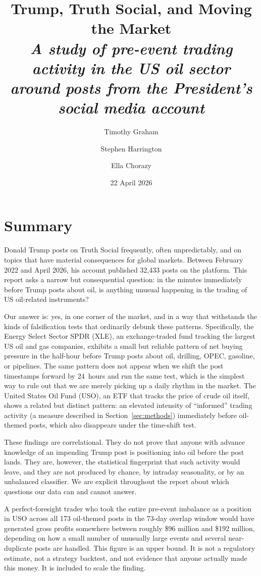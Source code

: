 \documentclass[11pt,a4paper]{article}
\title{\bfseries\Huge Trump, Truth Social, and Moving the Market\\[6pt]
       \large\mdseries\itshape A study of pre-event trading activity in the US oil sector\\
       around posts from the President's social media account}
\author{\large Timothy Graham \and Stephen Harrington \and Ella Chorazy}
\date{22 April 2026}
\begin{document}
\maketitle
\thispagestyle{empty}

\section*{Summary}

Donald Trump posts on Truth Social frequently, often unpredictably, and on topics that have material consequences for global markets. Between February 2022 and April 2026, his account published 32{,}433 posts on the platform. This report asks a narrow but consequential question: in the minutes immediately before Trump posts about oil, is anything unusual happening in the trading of US oil-related instruments?

Our answer is: yes, in one corner of the market, and in a way that withstands the kinds of falsification tests that ordinarily debunk these patterns. Specifically, the Energy Select Sector SPDR (XLE), an exchange-traded fund tracking the largest US oil and gas companies, exhibits a small but reliable pattern of net buying pressure in the half-hour before Trump posts about oil, drilling, OPEC, gasoline, or pipelines. The same pattern does not appear when we shift the post timestamps forward by 24~hours and run the same test, which is the simplest way to rule out that we are merely picking up a daily rhythm in the market. The United States Oil Fund (USO), an ETF that tracks the price of crude oil itself, shows a related but distinct pattern: an elevated intensity of ``informed'' trading activity (a measure described in Section~\ref{sec:methods}) immediately before oil-themed posts, which also disappears under the time-shift test.

These findings are correlational. They do not prove that anyone with advance knowledge of an impending Trump post is positioning into oil before the post lands. They are, however, the statistical fingerprint that such activity would leave, and they are not produced by chance, by intraday seasonality, or by an unbalanced classifier. We are explicit throughout the report about which questions our data can and cannot answer.

A perfect-foresight trader who took the entire pre-event imbalance as a position in USO across all 173 oil-themed posts in the 73-day overlap window would have generated gross profits somewhere between roughly \$96 million and \$192 million, depending on how a small number of unusually large events and several near-duplicate posts are handled. This figure is an upper bound. It is not a regulatory estimate, not a strategy backtest, and not evidence that anyone actually made this money. It is included to scale the finding.
\end{document}
